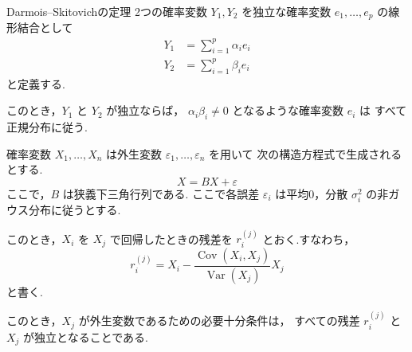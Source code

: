 \documentclass[uplatex, dvipdfmx]{jsarticle}
\begin{document}
\begin{thm}{Darmois--Skitovichの定理}
  2つの確率変数 $Y_1,Y_2$ を独立な確率変数
  $e_1, \dots ,e_p$ の線形結合として
  \begin{align}
    Y_1 &= \sum_{i=1}^{p} \alpha_i e_i \\
    Y_2 &= \sum_{i=1}^{p} \beta_i e_i
  \end{align}
  と定義する.

  このとき，$Y_1$ と $Y_2$ が独立ならば，
  $\alpha_i \beta_i \neq 0$ となるような確率変数 $e_i$ は
  すべて正規分布に従う.
\end{thm}

\begin{thm}{}
  確率変数 $X_1,\ldots,X_n$ は外生変数 $\varepsilon_1, \dots ,\varepsilon_n$ を用いて
  次の構造方程式で生成されるとする.
  \[
    X=BX+\varepsilon
  \]
  ここで，$B$ は狭義下三角行列である.
  ここで各誤差 $\varepsilon_i$ は平均0，分散 $\sigma_i^2$ の非ガウス分布に従うとする.

  このとき，$X_i$ を $X_j$ で回帰したときの残差を
  $r_i^{(j)}$ とおく.すなわち，
  \[
    r_i^{(j)} = X_i - \frac{\operatorname{Cov}(X_i,X_j)} {\operatorname{Var}(X_j)} X_j
  \]
  と書く.

  このとき，$X_j$ が外生変数であるための必要十分条件は，
  すべての残差 $r_i^{(j)}$ と $X_j$ が独立となることである.
\end{thm}
\end{document}
